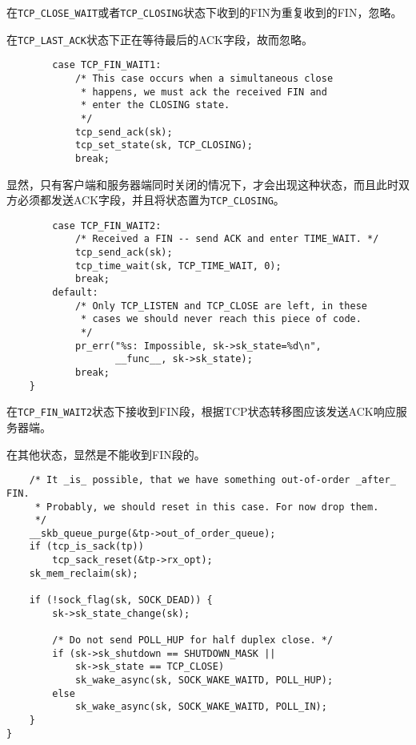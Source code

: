             在\texttt{TCP_CLOSE_WAIT}或者\texttt{TCP_CLOSING}状态下收到的FIN为重复收到的FIN，忽略。

            在\texttt{TCP_LAST_ACK}状态下正在等待最后的ACK字段，故而忽略。

\begin{verbatim}
        case TCP_FIN_WAIT1:
            /* This case occurs when a simultaneous close
             * happens, we must ack the received FIN and
             * enter the CLOSING state.
             */
            tcp_send_ack(sk);
            tcp_set_state(sk, TCP_CLOSING);
            break;
\end{verbatim}

            显然，只有客户端和服务器端同时关闭的情况下，才会出现这种状态，而且此时双方必须都发送ACK字段，并且将状态置为\texttt{TCP_CLOSING}。

\begin{verbatim}
        case TCP_FIN_WAIT2:
            /* Received a FIN -- send ACK and enter TIME_WAIT. */
            tcp_send_ack(sk);
            tcp_time_wait(sk, TCP_TIME_WAIT, 0);
            break;
        default:
            /* Only TCP_LISTEN and TCP_CLOSE are left, in these
             * cases we should never reach this piece of code.
             */
            pr_err("%s: Impossible, sk->sk_state=%d\n",
                   __func__, sk->sk_state);
            break;
    }
\end{verbatim}

            在\texttt{TCP_FIN_WAIT2}状态下接收到FIN段，根据TCP状态转移图应该发送ACK响应服务器端。

            在其他状态，显然是不能收到FIN段的。

\begin{verbatim}
    /* It _is_ possible, that we have something out-of-order _after_ FIN.
     * Probably, we should reset in this case. For now drop them.
     */
    __skb_queue_purge(&tp->out_of_order_queue);
    if (tcp_is_sack(tp))
        tcp_sack_reset(&tp->rx_opt);
    sk_mem_reclaim(sk);

    if (!sock_flag(sk, SOCK_DEAD)) {
        sk->sk_state_change(sk);

        /* Do not send POLL_HUP for half duplex close. */
        if (sk->sk_shutdown == SHUTDOWN_MASK ||
            sk->sk_state == TCP_CLOSE)
            sk_wake_async(sk, SOCK_WAKE_WAITD, POLL_HUP);
        else
            sk_wake_async(sk, SOCK_WAKE_WAITD, POLL_IN);
    }
}
\end{verbatim}

